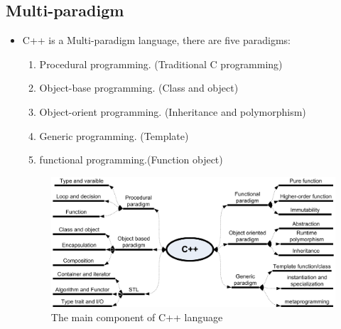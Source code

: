 \documentclass[a4paper,11pt,twoside]{book}
\begin{document}
\subsection{Multi-paradigm}
\begin{itemize}
	\item C++ is a Multi-paradigm language, there are five paradigms: 
	\begin{enumerate}
		\item Procedural programming. (Traditional C programming)
		\item Object-base programming. (Class and object)
		\item Object-orient programming. (Inheritance and polymorphism)
		\item Generic programming. (Template)
		\item functional programming.(Function object)
	\end{enumerate}
	
	\begin{figure}[h]
		\centering
		\includegraphics[width=0.85\linewidth]{pics/whole.png}
		\caption{The main component of C++ language}
		\label{fig:whole}
	\end{figure}

\end{itemize}
\end{document}
